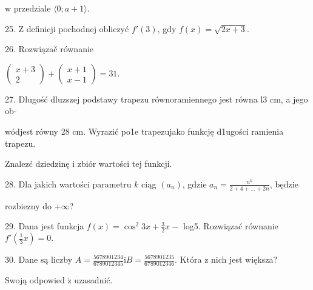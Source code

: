 \documentclass[a4paper,12pt]{article}
\begin{document}
w przedziale $\langle 0;a+1\rangle.$

25. $\mathrm{Z}$ definicji pochodnej obliczyć $f'(3)$, gdy $f(x)=\sqrt{2x+3}.$

26. Rozwiązač równanie

$\left(\begin{array}{l}
x+3\\
2
\end{array}\right)+\left(\begin{array}{l}
x+1\\
x-1
\end{array}\right)=31.$

27. Dlugość dluzszej podstawy trapezu równoramiennego jest równa l3 cm, a jego ob-

wódjest równy 28 cm. Wyrazić po1e trapezujako funkcję d1ugości ramienia trapezu.

Znalez$\acute{}$ć dziedzinę i zbiór wartości tej funkcji.

28. Dla jakich wartości parametru $k$ ciąg $(a_{n})$, gdzie $a_{n} = \displaystyle \frac{n^{k}}{2+4+\ldots+2n}$, będzie

rozbiezny do $+\infty$?

29. Dana jest funkcja $f(x)=\displaystyle \cos^{2}3x+\frac{3}{2}x-$ log5. Rozwiązać równanie $f'(\displaystyle \frac{1}{3}x)=0.$

30. Dane są liczby $A = \displaystyle \frac{5678901234}{6789012345} \mathrm{i} B = \displaystyle \frac{5678901235}{6789012346}$. Która z nich jest większa?

Swoją odpowied $\acute{\mathrm{z}}$ uzasadnić.
\end{document}
